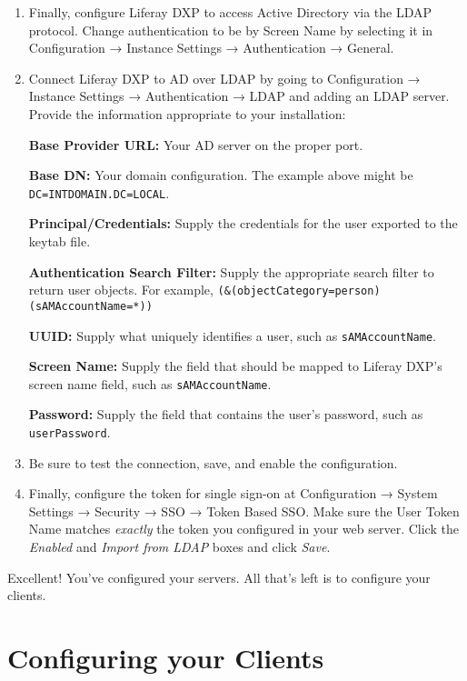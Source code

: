\begin{enumerate}
\def\labelenumi{\arabic{enumi}.}
\item
  Finally, configure Liferay DXP to access Active Directory via the LDAP
  protocol. Change authentication to be by Screen Name by selecting it
  in Configuration → Instance Settings → Authentication → General.
\item
  Connect Liferay DXP to AD over LDAP by going to Configuration →
  Instance Settings → Authentication → LDAP and adding an LDAP server.
  Provide the information appropriate to your installation:

  \textbf{Base Provider URL:} Your AD server on the proper port.

  \textbf{Base DN:} Your domain configuration. The example above might
  be \texttt{DC=INTDOMAIN.DC=LOCAL}.

  \textbf{Principal/Credentials:} Supply the credentials for the user
  exported to the keytab file.

  \textbf{Authentication Search Filter:} Supply the appropriate search
  filter to return user objects. For example,
  \texttt{(\&(objectCategory=person)(sAMAccountName=*))}

  \textbf{UUID:} Supply what uniquely identifies a user, such as
  \texttt{sAMAccountName}.

  \textbf{Screen Name:} Supply the field that should be mapped to
  Liferay DXP's screen name field, such as \texttt{sAMAccountName}.

  \textbf{Password:} Supply the field that contains the user's password,
  such as \texttt{userPassword}.
\item
  Be sure to test the connection, save, and enable the configuration.
\item
  Finally, configure the token for single sign-on at Configuration →
  System Settings → Security → SSO → Token Based SSO. Make sure the User
  Token Name matches \emph{exactly} the token you configured in your web
  server. Click the \emph{Enabled} and \emph{Import from LDAP} boxes and
  click \emph{Save}.
\end{enumerate}

Excellent! You've configured your servers. All that's left is to
configure your clients.

\section{Configuring your Clients}\label{configuring-your-clients}

